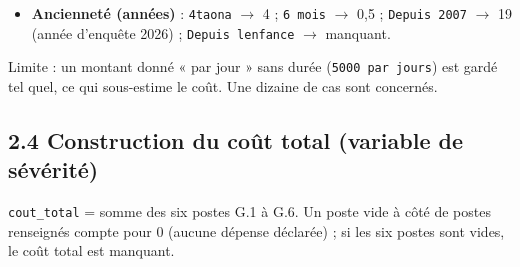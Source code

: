 \documentclass[

  french,

  10pt,

  a4paper,

]{article}
\begin{document}
\begin{itemize}
\item

  \textbf{Ancienneté (années)} : \texttt{4taona} \ensuremath{\rightarrow} 4 ; \texttt{6\ mois} \ensuremath{\rightarrow} 0,5 ; \texttt{Depuis\ 2007} \ensuremath{\rightarrow} 19 (année d'enquête 2026) ; \texttt{Depuis\ l\textquotesingle{}enfance} \ensuremath{\rightarrow} manquant.

\end{itemize}



Limite : un montant donné « par jour » sans durée (\texttt{5000\ par\ jours}) est gardé tel quel, ce qui sous-estime le coût. Une dizaine de cas sont concernés.



\subsection{2.4 Construction du coût total (variable de sévérité)}



\texttt{cout\_total} = somme des six postes G.1 à G.6. Un poste vide à côté de postes renseignés compte pour 0 (aucune dépense déclarée) ; si les six postes sont vides, le coût total est manquant.
\end{document}
